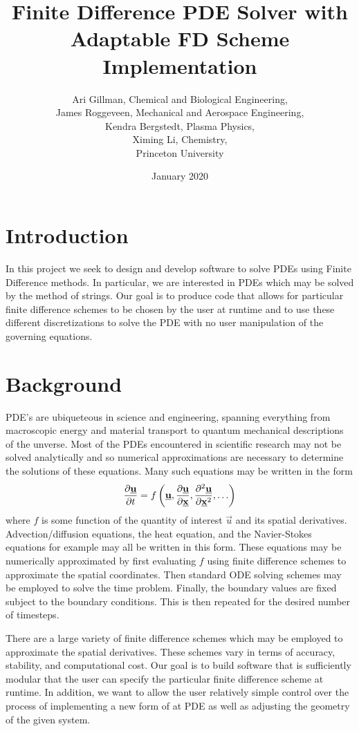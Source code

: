 \documentclass{article}
\title{Finite Difference PDE Solver with Adaptable FD Scheme Implementation}
\author{Ari Gillman, Chemical and Biological Engineering,\\
James Roggeveen, Mechanical and Aerospace Engineering,\\
Kendra Bergstedt, Plasma Physics,\\
Ximing Li, Chemistry,\\
Princeton University
}
\date{January 2020}
\begin{document}
	\maketitle
	\section{Introduction}
		In this project we seek to design and develop software to solve PDEs using Finite Difference methods. In particular, we are interested in PDEs which may be solved by the method of strings. Our goal is to produce code that allows for particular finite difference schemes to be chosen by the user at runtime and to use these different discretizations to solve the PDE with no user manipulation of the governing equations. 
	\section{Background}
		PDE's are ubiqueteous in science and engineering, spanning everything from macroscopic energy and material transport to quantum mechanical descriptions of the unverse. Most of the PDEs encountered in scientific research may not be solved analytically and so numerical approximations are necessary to determine the solutions of these equations. Many such equations may be written in the form
		\begin{equation}
		\frac{\partial \mathbf{\underline{u}}}{\partial t} = f\left(\mathbf{\underline{u}},\frac{\partial \mathbf{\underline{u}}}{\partial \mathbf{\underline{x}}},\frac{\partial^2 \mathbf{\underline{u}}}{\partial \mathbf{\underline{x}}^2},\ldots \right)
		\end{equation}
		where $f$ is some function of the quantity of interest $\vec{u}$ and its spatial derivatives. Advection/diffusion equations, the heat equation, and the Navier-Stokes equations for example may all be written in this form. These equations may be numerically approximated by first evaluating $f$ using finite difference schemes to approximate the spatial coordinates. Then standard ODE solving schemes may be employed to solve the time problem. Finally, the boundary values are fixed subject to the boundary conditions. This is then repeated for the desired number of timesteps. 

		There are a large variety of finite difference schemes which may be employed to approximate the spatial derivatives. These schemes vary in terms of accuracy, stability, and computational cost. Our goal is to build software that is sufficiently modular that the user can specify the particular finite difference scheme at runtime. In addition, we want to allow the user relatively simple control over the process of implementing a new form of at PDE as well as adjusting the geometry of the given system. 
\end{document}
